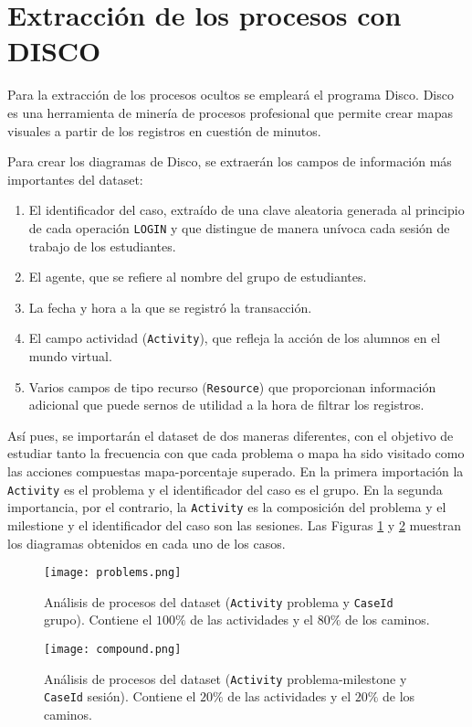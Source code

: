\section{Extracción de los procesos con DISCO}

Para la extracción de los procesos ocultos se empleará el programa Disco. Disco es una herramienta de minería de procesos profesional que permite crear mapas visuales a partir de los registros en cuestión de minutos.

Para crear los diagramas de Disco, se extraerán los campos de información más importantes del dataset:
\begin{enumerate}
\item El identificador del caso, extraído de una clave aleatoria generada al principio de cada operación \texttt{LOGIN} y que distingue de manera unívoca cada sesión de trabajo de los estudiantes.
\item El agente, que se refiere al nombre del grupo de estudiantes.
\item La fecha y hora a la que se registró la transacción.
\item El campo actividad (\texttt{Activity}), que refleja la acción de los alumnos en el mundo virtual.
\item Varios campos de tipo recurso (\texttt{Resource}) que proporcionan información adicional que puede sernos de utilidad a la hora de filtrar los registros.
\end{enumerate}

Así pues, se importarán el dataset de dos maneras diferentes, con el objetivo de estudiar tanto la frecuencia con que cada problema o mapa ha sido visitado como las acciones compuestas mapa-porcentaje superado. En la primera importación la \texttt{Activity} es el problema y el identificador del caso es el grupo. En la segunda importancia, por el contrario, la \texttt{Activity} es la composición del problema y el milestione y el identificador del caso son las sesiones. Las Figuras \ref{fig:problems} y \ref{fig:compound} muestran los diagramas obtenidos en cada uno de los casos.

\begin{figure}[H]
    \centering
    \texttt{[image: problems.png]}
    \caption{Análisis de procesos del dataset (\texttt{Activity} problema y \texttt{CaseId} grupo). Contiene el $100\%$ de las actividades y el $80\%$ de los caminos.}
    \label{fig:problems}
\end{figure}

\begin{figure}[H]
    \centering
    \texttt{[image: compound.png]}
    \caption{Análisis de procesos del dataset (\texttt{Activity} problema-milestone y \texttt{CaseId} sesión). Contiene el $20\%$ de las actividades y el $20\%$ de los caminos.}
    \label{fig:compound}
\end{figure}


